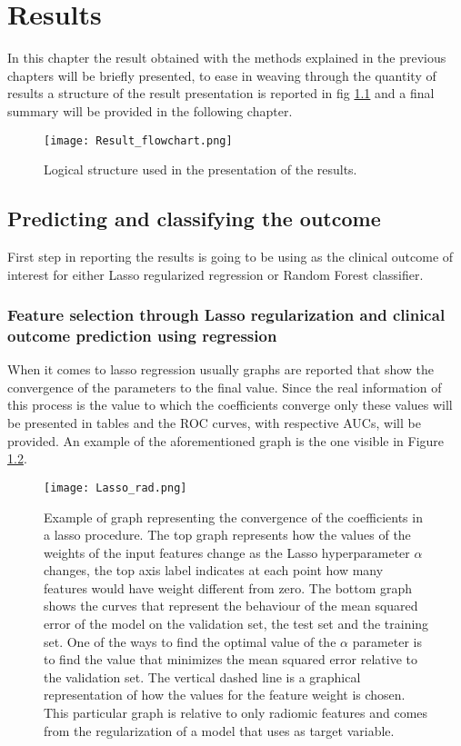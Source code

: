 \chapter{Results}
In this chapter the result obtained with the methods explained in the previous chapters will be briefly presented, to ease in weaving through the quantity of results a structure of the result presentation is reported in fig \ref{ResultFlowchart} and a final summary will be provided in the following chapter.

\begin{figure}[htbp]
  		\texttt{[image: Result\_flowchart.png]}
        \caption{Logical structure used in the presentation of the results.\label{ResultFlowchart}}
\end{figure}

\section{Predicting and classifying the outcome \death}
First step in reporting the results is going to be using \death as the clinical outcome of interest for either Lasso regularized regression or Random Forest classifier.

\subsection{Feature selection through Lasso regularization and clinical outcome prediction using regression}
When it comes to lasso regression usually graphs are reported that show the convergence of the parameters to the final value. Since the real information of this process is the value to which the coefficients converge only these values will be presented in tables and the ROC curves, with respective AUCs, will be provided. An example of the aforementioned graph is the one visible in Figure \ref{LassoParam}.


\begin{figure}[htbp]
  		\texttt{[image: Lasso\_rad.png]}
        \caption{Example of graph representing the convergence of the coefficients in a lasso procedure. The top graph represents how the values of the weights of the input features change as the Lasso hyperparameter $\alpha$ changes, the top axis label indicates at each point how many features would have weight different from zero. The bottom graph shows the curves that represent the behaviour of the mean squared error of the model on the validation set, the test set and the training set. One of the ways to find the optimal value of the $\alpha$ parameter is to find the value that minimizes the mean squared error relative to the validation set. The vertical dashed line is a graphical representation of how the values for the feature weight is chosen. This particular graph is relative to only radiomic features and comes from the regularization of a model that uses \death as target variable.\label{LassoParam}}
\end{figure}


